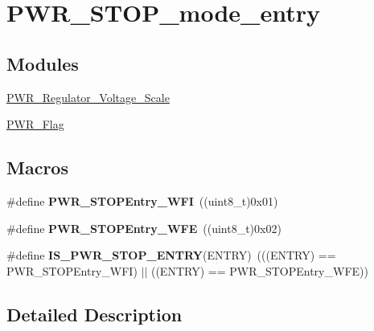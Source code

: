 \hypertarget{group___p_w_r___s_t_o_p__mode__entry}{}\section{P\+W\+R\+\_\+\+S\+T\+O\+P\+\_\+mode\+\_\+entry}
\label{group___p_w_r___s_t_o_p__mode__entry}
\subsection*{Modules}
\begin{DoxyCompactItemize}
\item 
\hyperlink{group___p_w_r___regulator___voltage___scale}{P\+W\+R\+\_\+\+Regulator\+\_\+\+Voltage\+\_\+\+Scale}
\item 
\hyperlink{group___p_w_r___flag}{P\+W\+R\+\_\+\+Flag}
\end{DoxyCompactItemize}
\subsection*{Macros}
\begin{DoxyCompactItemize}
\item 
\hypertarget{group___p_w_r___s_t_o_p__mode__entry_gaa1e1362f3d0b93e8f5f674e18cfc96c4}{}\#define {\bfseries P\+W\+R\+\_\+\+S\+T\+O\+P\+Entry\+\_\+\+W\+F\+I}~((uint8\+\_\+t)0x01)\label{group___p_w_r___s_t_o_p__mode__entry_gaa1e1362f3d0b93e8f5f674e18cfc96c4}

\item 
\hypertarget{group___p_w_r___s_t_o_p__mode__entry_gaac98ac55fb8764121d4168d99c9b369e}{}\#define {\bfseries P\+W\+R\+\_\+\+S\+T\+O\+P\+Entry\+\_\+\+W\+F\+E}~((uint8\+\_\+t)0x02)\label{group___p_w_r___s_t_o_p__mode__entry_gaac98ac55fb8764121d4168d99c9b369e}

\item 
\hypertarget{group___p_w_r___s_t_o_p__mode__entry_ga4a94eb1f400dec6e486fbc229cbea8a0}{}\#define {\bfseries I\+S\+\_\+\+P\+W\+R\+\_\+\+S\+T\+O\+P\+\_\+\+E\+N\+T\+R\+Y}(E\+N\+T\+R\+Y)~(((E\+N\+T\+R\+Y) == P\+W\+R\+\_\+\+S\+T\+O\+P\+Entry\+\_\+\+W\+F\+I) $\vert$$\vert$ ((E\+N\+T\+R\+Y) == P\+W\+R\+\_\+\+S\+T\+O\+P\+Entry\+\_\+\+W\+F\+E))\label{group___p_w_r___s_t_o_p__mode__entry_ga4a94eb1f400dec6e486fbc229cbea8a0}

\end{DoxyCompactItemize}


\subsection{Detailed Description}
